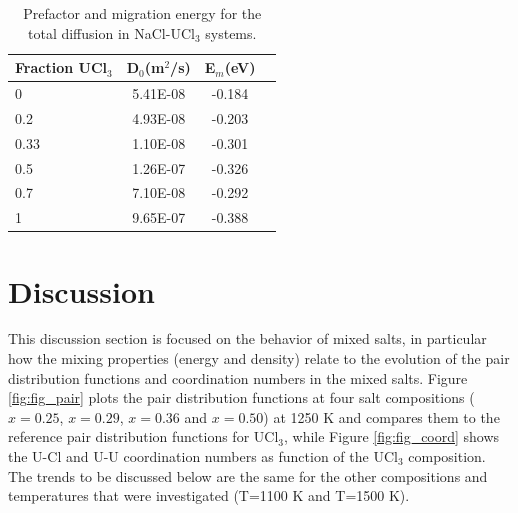 \documentclass[preprint,3p,10pt,onecolumn,number,sort&compress]{elsarticle}
\begin{document}
{\begin{table}[hb!]
\centering
\caption{Prefactor and migration energy for the total diffusion in NaCl-UCl$_3$ systems.}
\begin{tabular}{lccc|}
\hline
\hline
Fraction UCl$_3$	&	D$_0$(m$^2$/s)	&	E$_m$(eV)	\\
\hline
0	&	5.41E-08	&	-0.184	\\
0.2	&	4.93E-08	&	-0.203	\\
0.33	&	1.10E-08	&	-0.301	\\
0.5	&	1.26E-07	&	-0.326	\\
0.7	&	7.10E-08	&	-0.292	\\
1	&	9.65E-07	&	-0.388	\\
\hline
\hline
\end{tabular}
\label{table:diff}
\end{table}


\FloatBarrier

\section{Discussion}
\label{sec:discussion}
This discussion section is focused on the behavior of mixed salts, in particular how the mixing properties (energy and density) relate to the evolution of the pair distribution functions and coordination numbers in the mixed salts. Figure \ref{fig:fig_pair} plots the pair distribution functions at four salt compositions ($x=0.25$, $x=0.29$, $x=0.36$ and $x=0.50$) at 1250 K and compares them to the reference pair distribution functions for UCl$_3$, while Figure \ref{fig:fig_coord} shows the U-Cl and U-U coordination numbers as function of the UCl$_3$ composition. The trends to be discussed below are the same for the other compositions and temperatures that were investigated (T=1100 K and T=1500 K).

 
}
\end{document}
